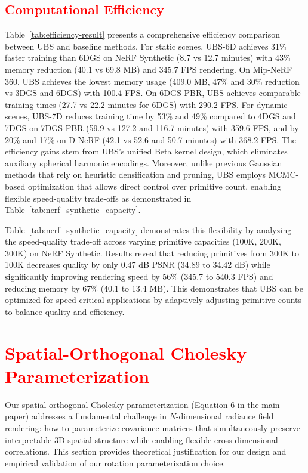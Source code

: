 \documentclass{article} %
\begin{document}
\subsection{\textcolor{red}{Computational Efficiency}}




Table~\ref{tab:efficiency-result} presents a comprehensive efficiency comparison between UBS and baseline methods. For static scenes, UBS-6D achieves 31\% faster training than 6DGS on NeRF Synthetic (8.7 vs 12.7 minutes) with 43\% memory reduction (40.1 vs 69.8 MB) and 345.7 FPS rendering. On Mip-NeRF 360, UBS achieves the lowest memory usage (409.0 MB, 47\% and 30\% reduction vs 3DGS and 6DGS) with 100.4 FPS. On 6DGS-PBR, UBS achieves comparable training times (27.7 vs 22.2 minutes for 6DGS) with 290.2 FPS. For dynamic scenes, UBS-7D reduces training time by 53\% and 49\% compared to 4DGS and 7DGS on 7DGS-PBR (59.9 vs 127.2 and 116.7 minutes) with 359.6 FPS, and by 20\% and 17\% on D-NeRF (42.1 vs 52.6 and 50.7 minutes) with 368.2 FPS. The efficiency gains stem from UBS's unified Beta kernel design, which eliminates auxiliary spherical harmonic encodings. Moreover, unlike previous Gaussian methods that rely on heuristic densification and pruning, UBS employs MCMC-based optimization that allows direct control over primitive count, enabling flexible speed-quality trade-offs as demonstrated in Table~\ref{tab:nerf_synthetic_capacity}.


Table~\ref{tab:nerf_synthetic_capacity} demonstrates this flexibility by analyzing the speed-quality trade-off across varying primitive capacities (100K, 200K, 300K) on NeRF Synthetic. Results reveal that reducing primitives from 300K to 100K decreases quality by only 0.47 dB PSNR (34.89 to 34.42 dB) while significantly improving rendering speed by 56\% (345.7 to 540.3 FPS) and reducing memory by 67\% (40.1 to 13.4 MB). This demonstrates that UBS can be optimized for speed-critical applications by adaptively adjusting primitive counts to balance quality and efficiency.




\section{\textcolor{red}{Spatial-Orthogonal Cholesky Parameterization}}
\label{app:spatial-orthogonal}



Our spatial-orthogonal Cholesky parameterization (Equation 6 in the main paper) addresses a fundamental challenge in $N$-dimensional radiance field rendering: how to parameterize covariance matrices that simultaneously preserve interpretable 3D spatial structure while enabling flexible cross-dimensional correlations. This section provides theoretical justification for our design and empirical validation of our rotation parameterization choice.
\end{document}
